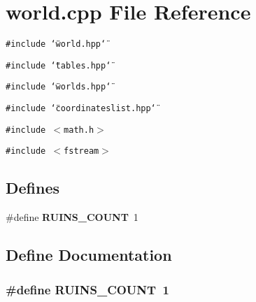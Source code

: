 \section{world.cpp File Reference}
\label{world_8cpp}
{\tt \#include \char`\"{}world.hpp\char`\"{}}\par
{\tt \#include \char`\"{}tables.hpp\char`\"{}}\par
{\tt \#include \char`\"{}worlds.hpp\char`\"{}}\par
{\tt \#include \char`\"{}coordinateslist.hpp\char`\"{}}\par
{\tt \#include $<$math.h$>$}\par
{\tt \#include $<$fstream$>$}\par
\subsection*{Defines}
\begin{CompactItemize}
\item 
\#define {\bf RUINS\_\-COUNT}~1
\end{CompactItemize}


\subsection{Define Documentation}
\subsubsection{\setlength{\rightskip}{0pt plus 5cm}\#define RUINS\_\-COUNT~1}\label{world_8cpp_a0}


